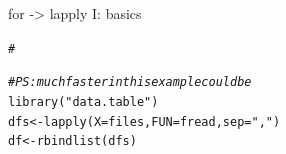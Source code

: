 \documentclass[xcolor=table,           xcolor=dvipsnames]{beamer}\usepackage[]{graphicx}\usepackage[]{color}
\makeatletter
\newcommand{\hlstr}[1]{\textcolor[rgb]{0.545,0.137,0.137}{#1}}
\newcommand{\hlcom}[1]{\textcolor[rgb]{0,0.392,0}{\textit{#1}}}
\newcommand{\hlstd}[1]{\textcolor[rgb]{0,0,0}{#1}}
\newcommand{\hlkwb}[1]{\textcolor[rgb]{0,0,0}{#1}}
\newcommand{\hlkwc}[1]{\textcolor[rgb]{1,0,1}{#1}}
\newcommand{\hlkwd}[1]{\textcolor[rgb]{0,0,1}{#1}}
\newenvironment{kframe}{%
 \def\at@end@of@kframe{}%
 \ifinner\ifhmode%
  \def\at@end@of@kframe{\end{minipage}}%
  \begin{minipage}{\columnwidth}%
 \fi\fi%
 \def\FrameCommand##1{\hskip\@totalleftmargin \hskip-\fboxsep
 \colorbox{shadecolor}{##1}\hskip-\fboxsep
     \hskip-\linewidth \hskip-\@totalleftmargin \hskip\columnwidth}%
 \MakeFramed {\advance\hsize-\width
   \@totalleftmargin\z@ \linewidth\hsize
   \@setminipage}}%
 {\par\unskip\endMakeFramed%
 \at@end@of@kframe}
\newenvironment{knitrout}{}{} %
\makeatother
\begin{document}
\begin{frame}[fragile]{for -> lapply I: basics}
\begin{knitrout}
\begin{kframe}
\begin{alltt}
\hlcom{#}
\end{alltt}
\end{kframe}
\end{knitrout}
\pause \vspace{-2.7em}
\begin{knitrout}
\color{fgcolor}\begin{kframe}
\begin{alltt}
\hlcom{# PS: much faster in this example could be}
\hlkwd{library}\hlstd{(}\hlstr{"data.table"}\hlstd{)}
\hlstd{dfs} \hlkwb{<-} \hlkwd{lapply}\hlstd{(}\hlkwc{X}\hlstd{=files,} \hlkwc{FUN}\hlstd{=fread,} \hlkwc{sep}\hlstd{=}\hlstr{","}\hlstd{)}
\hlstd{df} \hlkwb{<-} \hlkwd{rbindlist}\hlstd{(dfs)}
\end{alltt}
\end{kframe}
\end{knitrout}
\end{frame}

\end{document}
